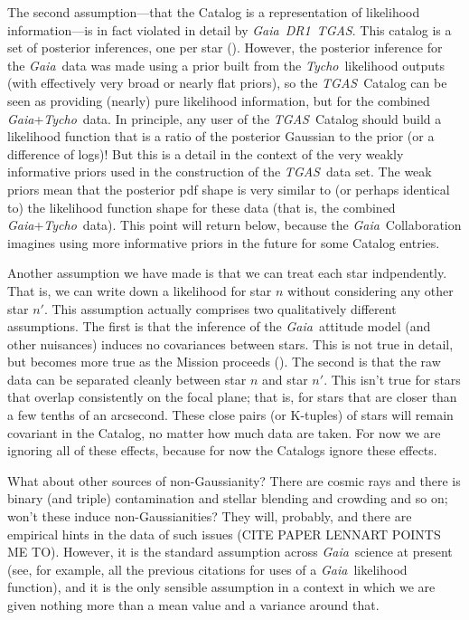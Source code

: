 \documentclass[12pt, modern]{aastex62h}
\newcommand{\acronym}[1]{{\small{#1}}}
\newcommand{\Gaia}{\textsl{Gaia}}
\newcommand{\Tycho}{\textsl{Tycho}}
\newcommand{\DRone}{\textsl{\acronym{DR1}}}
\newcommand{\TGAS}{\textsl{\acronym{TGAS}}}
\begin{document}
The second assumption---that the Catalog is a representation of likelihood
information---is in fact violated in detail by \Gaia\ \DRone\ \TGAS.
This catalog is a set of posterior inferences, one per star (\citealt{michalik, dr1}).
However, the posterior inference for the \Gaia\ data was made using a prior
built from the \Tycho\ likelihood outputs (with effectively very broad
or nearly flat priors),
so the \TGAS\ Catalog can be seen as providing (nearly) pure likelihood information,
but for the combined \Gaia +\Tycho\ data.
In principle, any user of the \TGAS\ Catalog should build a likelihood function
that is a ratio of the posterior Gaussian to the prior (or a difference
of logs)!
But this is a detail in the context of the very weakly informative priors
used in the construction of the \TGAS\ data set.
The weak priors mean that the posterior pdf shape is very similar to
(or perhaps identical to) the likelihood
function shape for these data (that is, the combined \Gaia +\Tycho\ data).
This point will return below, because the \Gaia\ Collaboration imagines using
more informative priors in the future for some Catalog entries.

Another assumption we have made is that we can treat each star indpendently.
That is, we can write down a likelihood for star $n$ without considering any
other star $n'$.
This assumption actually comprises two qualitatively different assumptions.
The first is that the inference of the \Gaia\ attitude model (and other nuisances)
induces no covariances between stars.
This is not true in detail, but becomes more true as the Mission proceeds
(\citealt{holl}).
The second is that the raw data can be separated cleanly between star $n$ and
star $n'$.
This isn't true for stars that overlap consistently on the focal plane; that is,
for stars that are closer than a few tenths of an arcsecond.
These close pairs (or K-tuples) of stars will remain covariant in the
Catalog, no matter how much data are taken.
For now we are ignoring all of these effects, because for now the Catalogs ignore
these effects.

What about other sources of non-Gaussianity?
There are cosmic rays and there is binary (and triple)
contamination and stellar blending and crowding and so on; won't these
induce non-Gaussianities?
They will, probably, and there are empirical hints in the data
of such issues (CITE PAPER LENNART POINTS ME TO).
However, it is the standard assumption across \Gaia\ science at
present (see, for example, all the previous citations for uses of a
\Gaia\ likelihood function), and it is the only sensible assumption in a
context in which we are given nothing more than a mean value and a variance
around that.
\end{document}
